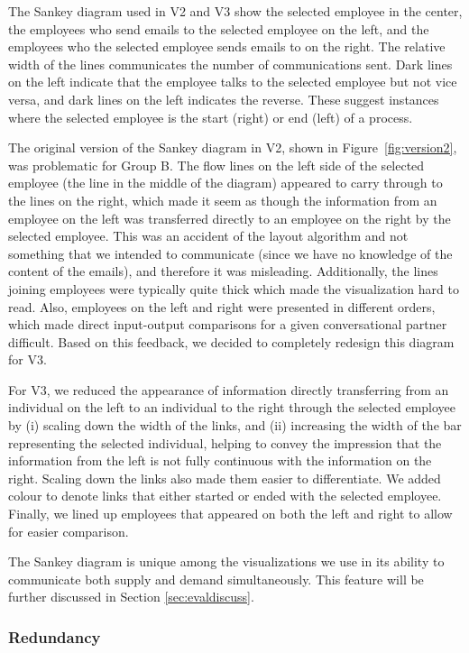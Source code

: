 \documentclass[journal]{vgtc}                %
\begin{document}
The Sankey diagram used in V2 and V3 show the selected employee in the center, the employees who send emails to the selected employee on the left, and the employees who the selected employee sends emails to on the right. The relative width of the lines communicates the number of communications sent. Dark lines on the left indicate that the employee talks to the selected employee but not vice versa, and dark lines on the left indicates the reverse. These suggest instances where the selected employee is the start (right) or end (left) of a process. 

The original version of the Sankey diagram in V2, shown in Figure~\ref{fig:version2}, was problematic for Group B. The flow lines on the left side of the selected employee (the line in the middle of the diagram) appeared to carry through to the lines on the right, which made it seem as though the information from an employee on the left was transferred directly to an employee on the right by the selected employee. This was an accident of the layout algorithm and not something that we intended to communicate (since we have no knowledge of the content of the emails), and therefore it was misleading.  Additionally, the lines joining employees were typically quite thick which made the visualization hard to read. Also, employees on the left and right were presented in different orders, which made direct input-output comparisons for a given conversational partner difficult. Based on this feedback, we decided to completely redesign this diagram for V3.

For V3, we reduced the appearance of information directly transferring from an individual on the left to an individual to the right through the selected employee by (i) scaling down the width of the links, and (ii) increasing the width of the bar representing the selected individual, helping to convey the impression that the information from the left is not fully continuous with the information on the right.  Scaling down the links also made them easier to differentiate. We added colour to denote links that either started or ended with the selected employee. Finally, we lined up employees that appeared on both the left and right to allow for easier comparison.

The Sankey diagram is unique among the visualizations we use in its ability to communicate both supply and demand simultaneously. This feature will be further discussed in Section \ref{sec:evaldiscuss}.

\subsubsection{Redundancy}
\end{document}
